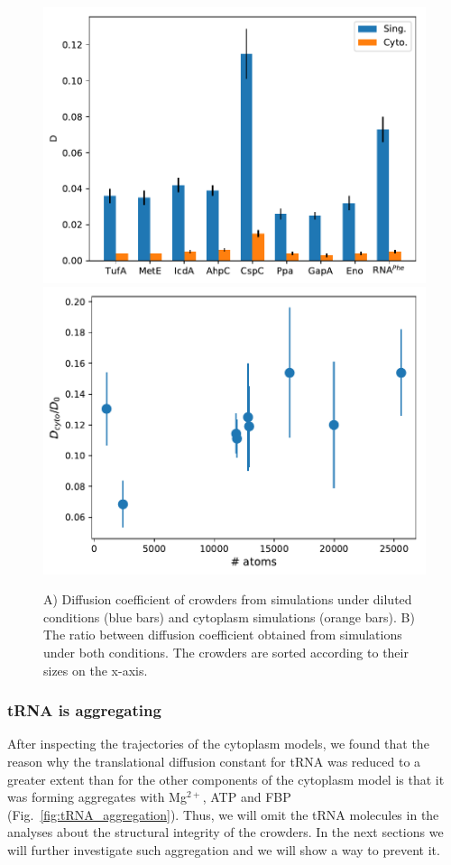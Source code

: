\documentclass[journal=jcisd8,manuscript=article]{achemso}
\begin{document}
\begin{figure}[H]
\includegraphics[scale=0.5]{msd.pdf}
\includegraphics[scale=0.5]{diff_cyto_over_singles.pdf}
\caption{A) Diffusion coefficient of crowders from simulations under
  diluted conditions (blue bars) and cytoplasm simulations (orange
  bars). B) The ratio between diffusion coefficient obtained from
  simulations under both conditions. The crowders are sorted according
  to their sizes on the x-axis.}
\label{fig:translational_diffusion}
\end{figure}

\subsubsection{tRNA is aggregating}
After inspecting the trajectories of the cytoplasm models, we found
that the reason why the translational diffusion constant for tRNA was
reduced to a greater extent than for the other components of the
cytoplasm model is that it was forming aggregates with Mg$^{2+}$, ATP
and FBP (Fig.~\ref{fig:tRNA_aggregation}). Thus, we will omit the tRNA
molecules in the analyses about the structural integrity of the
crowders. In the next sections we will further investigate such
aggregation and we will show a way to prevent it.
\end{document}
